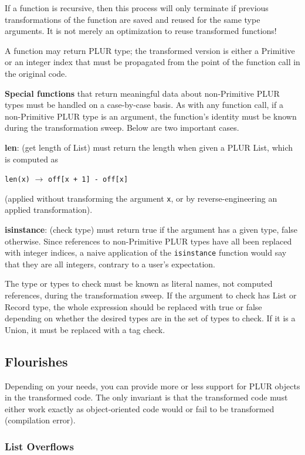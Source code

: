 \documentclass[10pt, conference, compsocconf]{IEEEtran}
\begin{document}
If a function is recursive, then this process will only terminate if previous transformations of the function are saved and reused for the same type arguments. It is not merely an optimization to reuse transformed functions!

A function may return PLUR type; the transformed version is either a Primitive or an integer index that must be propagated from the point of the function call in the original code.

{\bf Special functions} that return meaningful data about non-Primitive PLUR types must be handled on a case-by-case basis. As with any function call, if a non-Primitive PLUR type is an argument, the function's identity must be known during the transformation sweep. Below are two important cases.

{\bf len}: (get length of List) must return the length when given a PLUR List, which is computed as
\begin{center}
{\tt len(x)} $\to$ {\tt off[x + 1] - off[x]}
\end{center}
(applied without transforming the argument {\tt x}, or by reverse-engineering an applied transformation).

{\bf isinstance}: (check type) must return true if the argument has a given type, false otherwise. Since references to non-Primitive PLUR types have all been replaced with integer indices, a naive application of the {\tt isinstance} function would say that they are all integers, contrary to a user's expectation.

The type or types to check must be known as literal names, not computed references, during the transformation sweep. If the argument to check has List or Record type, the whole expression should be replaced with true or false depending on whether the desired types are in the set of types to check. If it is a Union, it must be replaced with a tag check.

\subsection{Flourishes}

Depending on your needs, you can provide more or less support for PLUR objects in the transformed code. The only invariant is that the transformed code must either work exactly as object-oriented code would or fail to be transformed (compilation error).

\subsubsection{List Overflows}
\end{document}

